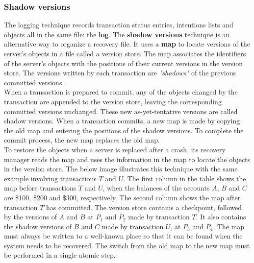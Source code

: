 \subsubsection{Shadow versions}
 The logging technique records transaction status entries, intentions lists and objects all in the same file: the \textbf{log}. The \textbf{shadow versions} technique is an alternative way to organize a recovery file. It uses a \textbf{map} to locate versions of the server’s objects in a file called a version store. The map associates the identifiers of the server’s objects with the positions of their current versions in the version store. The versions written by each transaction are \textit{"shadows"} of the previous committed versions.\\
When a transaction is prepared to commit, any of the objects changed by the transaction are appended to the version store, leaving the corresponding committed versions unchanged. These new as-yet-tentative versions are called shadow versions. When a transaction commits, a new map is made by copying the old map and entering the positions of the shadow versions. To complete the commit process, the new map replaces the old map.\\
To restore the objects when a server is replaced after a crash, its recovery manager reads the map and uses the information in the map to locate the objects in the version store. The below image illustrates this technique with the same example involving transactions $T$ and $U$. The first column in the table shows the map before transactions $T$ and $U$, when the balances of the accounts $A$, $B$ and $C$ are \$100, \$200 and \$300, respectively. The second column shows the map after transaction $T$ has committed.
The version store contains a checkpoint, followed by the versions of $A$ and $B$ at $P_1$
and $P_2$ made by transaction $T$. It also contains the shadow versions of $B$ and $C$ made by
transaction $U$, at $P_3$ and $P_4$.
The map must always be written to a well-known place so that it can be found when the system needs to
be recovered. The switch from the old map to the new map must be performed in a single atomic step.

